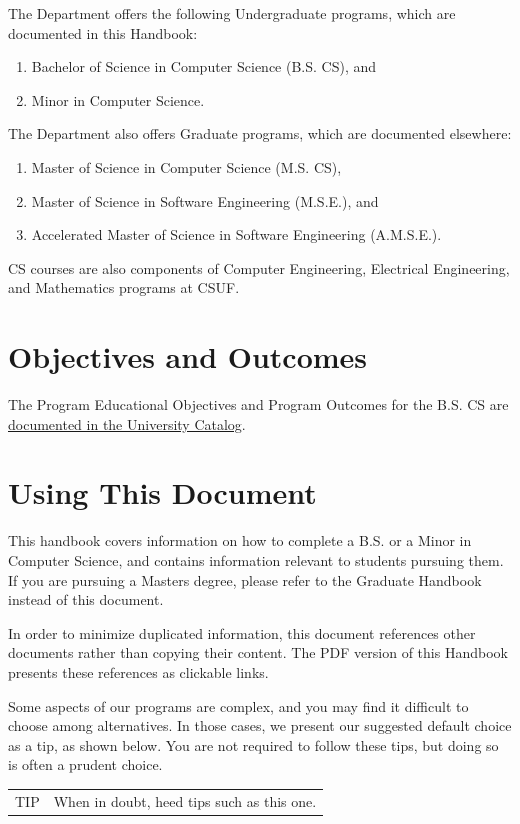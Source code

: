 \documentclass{book}
\newenvironment{tip}{
  \tcolorbox \begin{tabular}{m{.5in} m{5in}} \Large{TIP} &
}{
  \end{tabular} \endtcolorbox
}
\newcommand{\CampusName}{CSUF}
\begin{document}
The Department offers the following Undergraduate programs, which are documented in this Handbook:
\begin{enumerate}
\item Bachelor of Science in Computer Science (B.S. CS), and
\item Minor in Computer Science.
\end{enumerate}

The Department also offers Graduate programs, which are documented elsewhere:
\begin{enumerate}
\item Master of Science in Computer Science (M.S. CS),
\item Master of Science in Software Engineering (M.S.E.), and
\item Accelerated Master of Science in Software Engineering (A.M.S.E.).
\end{enumerate}

CS courses are also components of Computer Engineering, Electrical Engineering, and Mathematics programs at \CampusName.

\section{Objectives and Outcomes}
 
The Program Educational Objectives and Program Outcomes for the B.S. CS are \href{http://catalog.fullerton.edu/preview_entity.php?catoid=2&ent_oid=113&returnto=137#Learning_Goals_and_Student_Learning_Outcomes}{documented in the University Catalog}.

\section{Using This Document}

This handbook covers information on how to complete a B.S. or a Minor in Computer Science, and contains information relevant to students pursuing them. If you are pursuing a Masters degree, please refer to the Graduate Handbook instead of this document.

In order to minimize duplicated information, this document references other documents rather than copying their content. The PDF version of this Handbook presents these references as clickable links.

Some aspects of our programs are complex, and you may find it difficult to choose among alternatives. In those cases, we present our suggested default choice as a tip, as shown below. You are not required to follow these tips, but doing so is often a prudent choice.
\begin{tip}
When in doubt, heed tips such as this one.
\end{tip}
\end{document}
